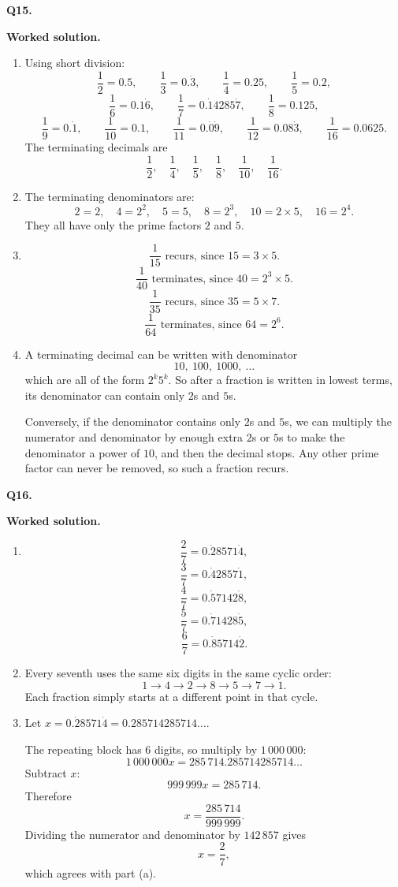 \documentclass[12pt,a4paper]{article}
\newcommand{\wsol}{%
  \par\smallskip
  \noindent\textbf{\color{blue!50!black}Worked solution.}\space}
\begin{document}
\medskip
\noindent\textbf{Q15.}
\wsol
\begin{enumerate}[label=(\alph*),leftmargin=*]
\item Using short division:
\[
\frac12=0.5,\qquad
\frac13=0.\dot{3},\qquad
\frac14=0.25,\qquad
\frac15=0.2,
\]
\[
\frac16=0.1\dot{6},\qquad
\frac17=0.\dot{1}4285\dot{7},\qquad
\frac18=0.125,
\]
\[
\frac19=0.\dot{1},\qquad
\frac1{10}=0.1,\qquad
\frac1{11}=0.\dot{0}\dot{9},\qquad
\frac1{12}=0.08\dot{3},\qquad
\frac1{16}=0.0625.
\]
The terminating decimals are
\[
\frac12,\quad\frac14,\quad\frac15,\quad\frac18,\quad\frac1{10},\quad\frac1{16}.
\]

\item The terminating denominators are:
\[
2=2,\quad 4=2^2,\quad 5=5,\quad 8=2^3,\quad 10=2\times5,\quad 16=2^4.
\]
They all have only the prime factors $2$ and $5$.

\item
\[
\frac1{15}\text{ recurs, since }15=3\times5.
\]
\[
\frac1{40}\text{ terminates, since }40=2^3\times5.
\]
\[
\frac1{35}\text{ recurs, since }35=5\times7.
\]
\[
\frac1{64}\text{ terminates, since }64=2^6.
\]

\item A terminating decimal can be written with denominator
\[
10,\ 100,\ 1000,\ \ldots
\]
which are all of the form $2^k5^k$. So after a fraction is written in lowest terms, its denominator can contain only $2$s and $5$s.

Conversely, if the denominator contains only $2$s and $5$s, we can multiply the numerator and denominator by enough extra $2$s or $5$s to make the denominator a power of $10$, and then the decimal stops. Any other prime factor can never be removed, so such a fraction recurs.
\end{enumerate}

\medskip
\noindent\textbf{Q16.}
\wsol
\begin{enumerate}[label=(\alph*),leftmargin=*]
\item
\[
\frac27=0.\dot{2}8571\dot{4},
\]
\[
\frac37=0.\dot{4}2857\dot{1},
\]
\[
\frac47=0.\dot{5}7142\dot{8},
\]
\[
\frac57=0.\dot{7}1428\dot{5},
\]
\[
\frac67=0.\dot{8}5714\dot{2}.
\]

\item Every seventh uses the same six digits in the same cyclic order:
\[
1\to4\to2\to8\to5\to7\to1.
\]
Each fraction simply starts at a different point in that cycle.

\item Let $x=0.\dot{2}8571\dot{4}=0.285714285714\ldots$.

The repeating block has $6$ digits, so multiply by $1\,000\,000$:
\[
1\,000\,000x=285\,714.285714285714\ldots
\]
Subtract $x$:
\[
999\,999x=285\,714.
\]
Therefore
\[
x=\frac{285\,714}{999\,999}.
\]
Dividing the numerator and denominator by $142\,857$ gives
\[
x=\frac27,
\]
which agrees with part (a).
\end{enumerate}
\end{document}
